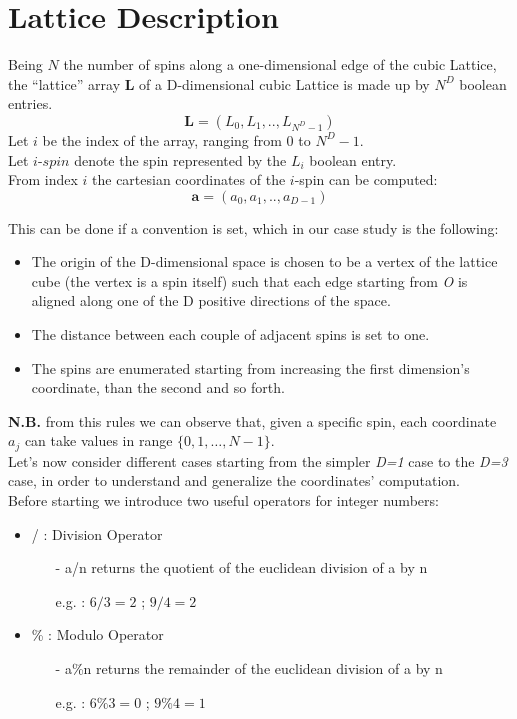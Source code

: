 \documentclass[11]{article}
\begin{document}
\newcommand\tab[1][1cm]{\hspace*{#1}}

\section*{Lattice Description}

Being $N$ the number of spins along a one-dimensional edge of the cubic Lattice, \\ 
the “lattice” array $\mathbf{L}$ of a D-dimensional cubic Lattice is made up by $N^{D}$ boolean entries.\\ 
$$\mathbf{L} = (L_0,L_1,..,L_{N^D-1})$$
Let $i$ be the index of the array, ranging from $0$ to $N^D-1$.\\
Let $i$-$spin$ denote the spin represented by the $L_i$ boolean entry. \\
From index $i$ the cartesian coordinates of the $i$-spin can be computed: \\ 
$$\mathbf{a} = (a_0,a_1,..,a_{D-1})$$

This can be done if a convention is set, which in our case study is the following: \\ 

\begin{itemize}
	\item The origin of the D-dimensional space is chosen to be a vertex of the lattice cube (the vertex is a spin itself) such that each edge starting from \textit{O} is aligned along one of the D positive directions of the space.
	\item The distance between each couple of adjacent spins is set to one. 
	\item The spins are enumerated starting from increasing the first dimension’s coordinate, than the second and so forth.
\end{itemize}

\textbf{N.B.} from this rules we can observe that, given a specific spin, each coordinate $a_j$ can take values in range 
$\{0,1,…,N-1\}$. \\ 

Let’s now consider different cases starting from the simpler \textit{D=1} case to the \textit{D=3} case, in order to understand and generalize the coordinates’ computation. \\
Before starting we introduce two useful operators for integer numbers: 
\begin{itemize}
	\item / : Division Operator	
		\begin{itemize}
			\item[-] a/n returns the quotient of the euclidean division of a by n
			\item[e.g.] : $6/3 = 2$ ; $9/4 = 2$
		\end{itemize}
	\item \% : Modulo Operator
		\begin{itemize}
			\item[-] a\%n returns the remainder of the euclidean division of a by n 
			\item[e.g.] : $6\%3 = 0$ ; $9\%4 = 1$
		\end{itemize} 
\end{itemize}
\end{document}
